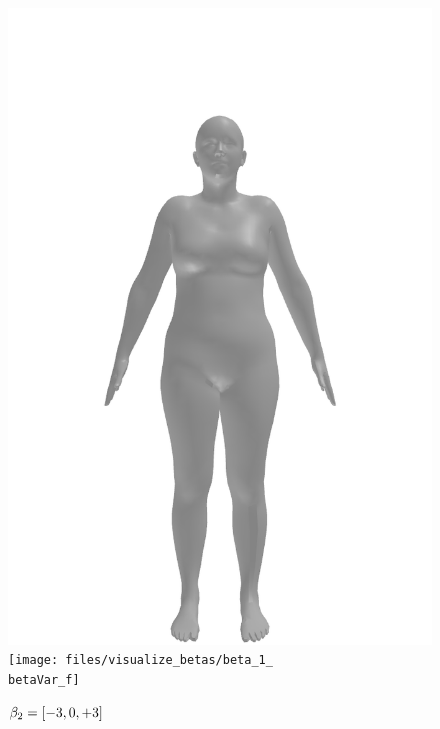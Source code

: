 \begin{figure}[ht!]
\begin{minipage}[b]{\textwidth}
        \includegraphics[width=\imgWidth]{files/visualize_betas/baseline_f}
        \texttt{[image: files/visualize\_betas/beta\_1\_\\betaVar\_f]}
        \caption{$\beta_2 = [-3, 0, +3]$}
    \end{minipage}
\end{figure}


